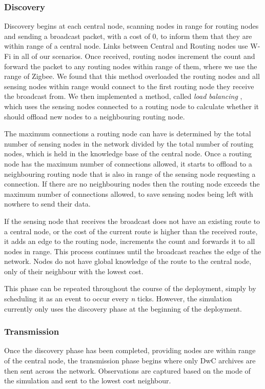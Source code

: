 \subsubsection{Discovery}\label{sim:disc}
	Discovery begins at each central node, scanning nodes in range for routing nodes and sending a broadcast packet, with a cost of 0, to inform them that they are within range of a central node. Links between Central and Routing nodes use W-Fi in all of our scenarios. Once received, routing nodes increment the count and forward the packet to any routing nodes within range of them, where we use the range of Zigbee. We found that this method overloaded the routing nodes and all sensing nodes within range would connect to the first routing node they receive the broadcast from. We then implemented a method, called \textit{load balancing} \cite{Gupta2003}, which uses the sensing nodes connected to a routing node to calculate whether it should offload new nodes to a neighbouring routing node.

	The maximum connections a routing node can have is determined by the total number of sensing nodes in the network divided by the total number of routing nodes, which is held in the knowledge base of the central node. Once a routing node has the maximum number of connections allowed, it starts to offload to a neighbouring routing node that is also in range of the sensing node requesting a connection. If there are no neighbouring nodes then the routing node exceeds the maximum number of connections allowed, to save sensing nodes being left with nowhere to send their data.

	If the sensing node that receives the broadcast does not have an existing route to a central node, or the cost of the current route is higher than the received route, it adds an edge to the routing node, increments the count and forwards it to all nodes in range. This process continues until the broadcast reaches the edge of the network. Nodes do not have global knowledge of the route to the central node, only of their neighbour with the lowest cost.

	This phase can be repeated throughout the course of the deployment, simply by scheduling it as an event to occur every \textit{n} ticks. However, the simulation currently only uses the discovery phase at the beginning of the deployment.

\subsubsection{Transmission}
	Once the discovery phase has been completed, providing nodes are within range of the central node, the transmission phase begins where only DwC archives are then sent across the network. Observations are captured based on the mode of the simulation and sent to the lowest cost neighbour.

